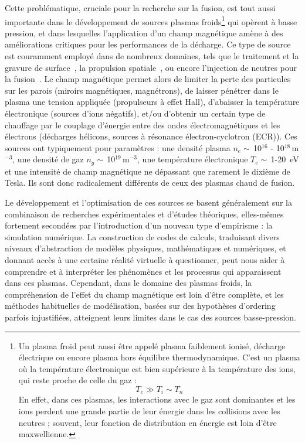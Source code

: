 \begin{refsection}
Cette problématique, cruciale pour la recherche sur la fusion, est tout aussi
importante dans le développement de sources plasmas froids\footnote{Un plasma
froid peut aussi être appelé plasma faiblement ionisé, décharge électrique ou
encore plasma hors équilibre thermodynamique.
C'est un plasma où la température électronique est bien supérieure à
la température des ions, qui reste proche de celle du gaz :$$T_e\gg
T_i\sim T_n$$ En effet, dans ces plasmas, les interactions avec le gaz sont dominantes et les
ions perdent une grande partie de
leur énergie dans les collisions avec les neutres ; souvent, leur fonction de
distribution en énergie est loin d'être maxwellienne.} qui opèrent à basse pression, et dans lesquelles
l'application d'un champ magnétique amène à des améliorations critiques pour les
performances de la décharge. Ce type de source est couramment employé dans de
nombreux domaines, tels que le traitement et la gravure de
surface~\parencite{Lieberman}, la propulsion spatiale~\parencite{Zhurin}, ou
encore l'injection de neutres pour la fusion~\parencite{SimoninHDR}. Le champ
magnétique permet alors de limiter la perte des particules sur les parois
(miroirs magnétiques, magnétrons), de laisser pénétrer dans le plasma une
tension appliquée (propulseurs à effet Hall), d'abaisser la température
électronique (sources d'ions négatifs), et/ou d'obtenir un certain
type de chauffage par le couplage d'énergie entre des ondes électromagnétiques et les électrons (décharges hélicons, sources à résonance électron-cyclotron (ECR)). Ces sources ont typiquement pour paramètres : une densité plasma $n_e\sim\,$10$^{16}$ - 10$^{18}\,$m$^{-3}$, une densité de gaz $n_g\sim\,$10$^{19}\,$m$^{-3}$, une température électronique $T_e\sim\,$1-20~eV et une intensité de champ magnétique ne dépassant que rarement le dixième de Tesla. Ils sont donc radicalement différents de ceux des plasmas chaud de fusion.

Le développement et l'optimisation de ces sources se basent généralement sur la
combinaison de recherches expérimentales et d'études théoriques, elles-mêmes
fortement secondées par l'introduction d'un nouveau type d'empirisme : la
simulation numérique.
La construction de codes de calculs, traduisant divers niveaux d'abstraction de
modèles physiques, mathématiques et numériques, et donnant accès à une
certaine réalité virtuelle à questionner, peut nous aider à
comprendre et à interpréter les phénomènes et les processus qui apparaissent dans ces
plasmas. Cependant, dans le domaine des plasmas froids, la compréhension de
l'effet du champ magnétique est loin d'être complète, et les méthodes
habituelles de modélisation, basées sur des hypothèses d'ordering parfois
injustifiées, atteignent leurs limites dans le cas des sources basse-pression. 


\end{refsection}

